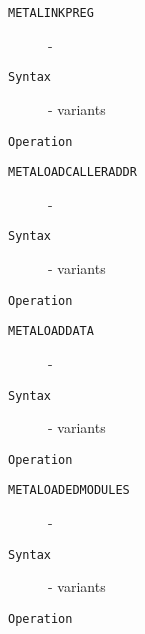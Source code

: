 \clearpage
\begin{description}
\item[\texttt{METALINKPREG}]  - \\
\item[\texttt{Syntax}] - variants\\

\item[\texttt{Operation}]
\item[\texttt{}]
\end{description}
\clearpage
\begin{description}
\item[\texttt{METALOADCALLERADDR}]  - \\
\item[\texttt{Syntax}] - variants\\

\item[\texttt{Operation}]
\item[\texttt{}]
\end{description}
\clearpage
\begin{description}
\item[\texttt{METALOADDATA}]  - \\
\item[\texttt{Syntax}] - variants\\

\item[\texttt{Operation}]
\item[\texttt{}]
\end{description}
\clearpage
\begin{description}
\item[\texttt{METALOADEDMODULES}]  - \\
\item[\texttt{Syntax}] - variants\\

\item[\texttt{Operation}]
\item[\texttt{}]
\end{description}
